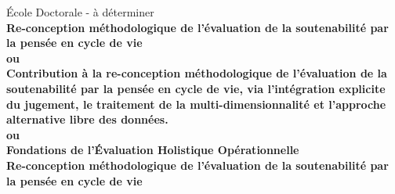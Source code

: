 \documentclass[12pt,twoside,a4paper,english,french]{book} %
\begin{document}
\begin{titlepage}
  École Doctorale - à déterminer\\%
  { \large \bfseries
Re-conception méthodologique de l'évaluation de la soutenabilité par la pensée en cycle de vie\\
ou\\
Contribution à la re-conception méthodologique de l'évaluation de la soutenabilité par la pensée en cycle de vie, via l'intégration explicite du jugement, le traitement de la multi-dimensionnalité et l'approche alternative libre des données.\\
ou\\
Fondations de l'Évaluation Holistique Opérationnelle\\Re-conception méthodologique de l'évaluation de la soutenabilité par la pensée en cycle de vie
}
\end{titlepage}
\end{document}
